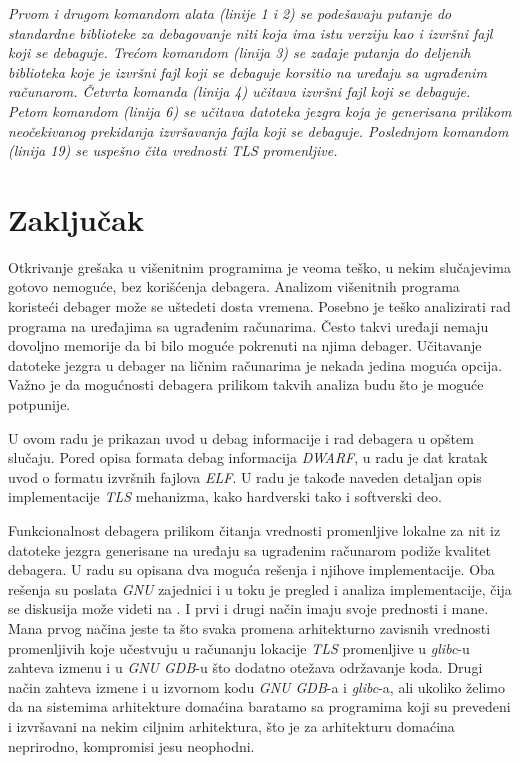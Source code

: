 \documentclass[12pt,oneside]{memoir}
\begin{document}
\emph{Prvom i drugom komandom alata (linije 1 i 2) se podešavaju putanje do standardne biblioteke za debagovanje niti koja ima istu verziju kao i izvršni fajl koji se debaguje. Trećom komandom (linija 3) se zadaje putanja do deljenih biblioteka koje je izvršni fajl koji se debaguje korsitio na uređaju sa ugrađenim računarom. Četvrta komanda (linija 4) učitava izvršni fajl koji se debaguje. Petom komandom (linija 6) se učitava datoteka jezgra koja je generisana prilikom neočekivanog prekidanja izvršavanja fajla koji se debaguje. Poslednjom komandom (linija 19) se uspešno čita vrednosti \emph{TLS} promenljive.}

\chapter{Zaključak}

Otkrivanje grešaka u višenitnim programima je veoma teško, u nekim slučajevima gotovo nemoguće, bez korišćenja debagera. Analizom višenitnih programa koristeći debager može se uštedeti dosta vremena. Posebno je teško analizirati rad programa na uređajima sa ugrađenim računarima. Često takvi uređaji nemaju dovoljno memorije da bi bilo moguće pokrenuti na njima debager. Učitavanje datoteke jezgra u debager na ličnim računarima je nekada jedina moguća opcija. Važno je da mogućnosti debagera prilikom takvih analiza budu što je moguće potpunije.

U ovom radu je prikazan uvod u debag informacije i rad debagera u opštem slučaju. Pored opisa formata debag informacija \emph{DWARF}, u radu je dat kratak uvod o formatu izvršnih fajlova \emph{ELF}. U radu je takođe naveden detaljan opis implementacije \emph{TLS} mehanizma, kako hardverski tako i softverski deo.

Funkcionalnost debagera prilikom čitanja vrednosti promenljive lokalne za nit iz datoteke jezgra generisane na uređaju sa ugrađenim računarom podiže kvalitet debagera. U radu su opisana dva moguća rešenja i njihove implementacije. Oba rešenja su poslata \emph{GNU} zajednici i u toku je pregled i analiza implementacije, čija se diskusija može videti na \cite{TLSPatch}. I prvi i drugi način imaju svoje prednosti i mane. Mana prvog načina jeste ta što svaka promena arhitekturno zavisnih vrednosti promenljivih koje učestvuju u računanju lokacije \emph{TLS} promenljive u \emph{glibc}-u zahteva izmenu i u \emph{GNU GDB}-u što dodatno otežava održavanje koda. Drugi način zahteva izmene i u izvornom kodu \emph{GNU GDB}-a i \emph{glibc}-a, ali ukoliko želimo da na sistemima arhitekture domaćina baratamo sa programima koji su prevedeni i izvršavani na nekim ciljnim arhitektura, što je za arhitekturu domaćina neprirodno, kompromisi jesu neophodni.
\end{document}
